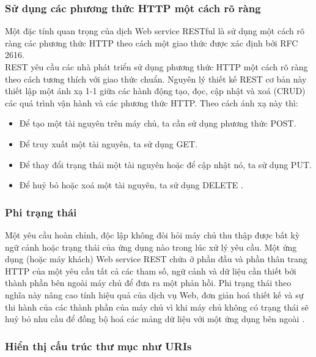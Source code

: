 \documentclass[12pt,a4paper,oneside]{extbook}
\begin{document}
\subsubsection{Sử dụng các phương thức HTTP một cách rõ ràng}

Một đặc tính quan trọng của dịch Web service RESTful là sử dụng một cách rõ ràng các phương thức HTTP theo cách một giao thức được xác định bởi RFC 2616.\\

\noindent
REST yêu cầu các nhà phát triển sử dụng phương thức HTTP một cách rõ ràng theo cách tương thích với giao thức chuẩn. Nguyên lý thiết kế REST cơ bản này thiết lập một ánh xạ 1-1 giữa các hành động tạo, đọc, cập nhật và xoá (CRUD) các quá trình vận hành và các phương thức HTTP. Theo cách ánh xạ này thì:

\begin{itemize}[topsep=1mm,itemsep=-0.5mm]
\item Để tạo một tài nguyên trên máy chủ, ta cần sử dụng phương thức POST.
\item Để truy xuất một tài nguyên, ta sử dụng GET.
\item Để thay đổi trạng thái một tài nguyên hoặc để cập nhật nó, ta sử dụng PUT.
\item Để huỷ bỏ hoặc xoá một tài nguyên, ta sử dụng DELETE \cite{restful-basic}.
\vspace{1mm}
\end{itemize}

\subsubsection{Phi trạng thái}

Một yêu cầu hoàn chỉnh, độc lập không đòi hỏi máy chủ thu thập được bất kỳ ngữ cảnh hoặc trạng thái của ứng dụng nào trong lúc xử lý yêu cầu. Một ứng dụng (hoặc máy khách) Web service REST chứa ở phần đầu và phần thân trang HTTP của một yêu cầu tất cả các tham số, ngữ cảnh và dữ liệu cần thiết bởi thành phần bên ngoài máy chủ để đưa ra một phản hồi. Phi trạng thái theo nghĩa này nâng cao tính hiệu quả của dịch vụ Web, đơn giản hoá thiết kế và sự thi hành của các thành phần của máy chủ vì khi máy chủ không có trạng thái sẽ huỷ bỏ nhu cầu để đồng bộ hoá các mảng dữ liệu với một ứng dụng bên ngoài \cite{restful-basic}.

\subsubsection{Hiển thị cấu trúc thư mục như URIs}
\end{document}
